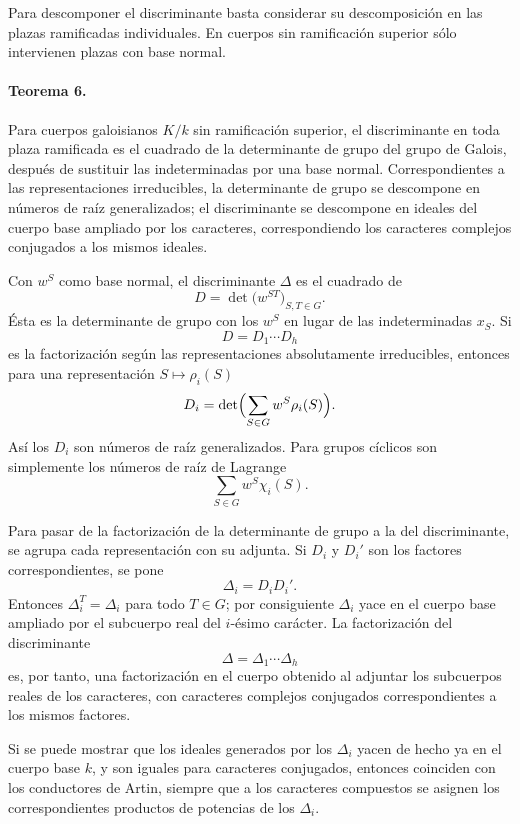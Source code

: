 Para descomponer el discriminante basta considerar su descomposición en las plazas ramificadas individuales. En cuerpos sin ramificación superior sólo intervienen plazas con base normal.

\paragraph{Teorema 6.}
Para cuerpos galoisianos \(K/k\) sin ramificación superior, el discriminante en toda plaza ramificada es el cuadrado de la determinante de grupo del grupo de Galois, después de sustituir las indeterminadas por una base normal. Correspondientes a las representaciones irreducibles, la determinante de grupo se descompone en números de raíz generalizados; el discriminante se descompone en ideales del cuerpo base ampliado por los caracteres, correspondiendo los caracteres complejos conjugados a los mismos ideales.

Con \(w^S\) como base normal, el discriminante \(\Delta\) es el cuadrado de
\[
        D=\det\bigl(w^{ST}\bigr)_{S,T\in G}.
\]
Ésta es la determinante de grupo con los \(w^S\) en lugar de las indeterminadas \(x_S\). Si
\[
        D=D_1\cdots D_h
\]
es la factorización según las representaciones absolutamente irreducibles, entonces para una representación \(S\mapsto \rho_i(S)\)
\[
        D_i=\det\Bigl(\sum_{S\in G} w^S\rho_i(S)\Bigr).
\]
Así los \(D_i\) son números de raíz generalizados. Para grupos cíclicos son simplemente los números de raíz de Lagrange
\[
        \sum_{S\in G} w^S\chi_i(S).
\]

Para pasar de la factorización de la determinante de grupo a la del discriminante, se agrupa cada representación con su adjunta. Si \(D_i\) y \(D_i'\) son los factores correspondientes, se pone
\[
        \Delta_i=D_iD_i'.
\]
Entonces \(\Delta_i^T=\Delta_i\) para todo \(T\in G\); por consiguiente \(\Delta_i\) yace en el cuerpo base ampliado por el subcuerpo real del \(i\)-ésimo carácter. La factorización del discriminante
\[
        \Delta=\Delta_1\cdots\Delta_h
\]
es, por tanto, una factorización en el cuerpo obtenido al adjuntar los subcuerpos reales de los caracteres, con caracteres complejos conjugados correspondientes a los mismos factores.

Si se puede mostrar que los ideales generados por los \(\Delta_i\) yacen de hecho ya en el cuerpo base \(k\), y son iguales para caracteres conjugados, entonces coinciden con los conductores de Artin, siempre que a los caracteres compuestos se asignen los correspondientes productos de potencias de los \(\Delta_i\).

